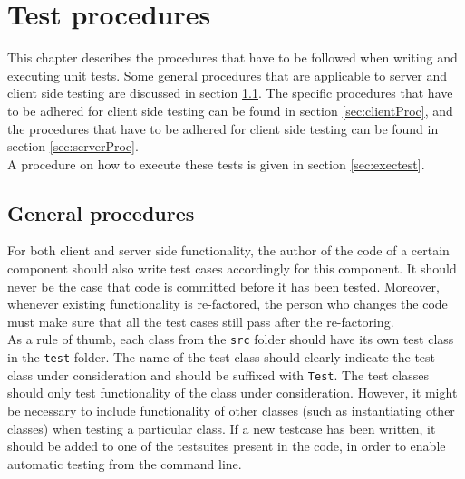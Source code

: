 \chapter{Test procedures}\label{chap:testProc}
This chapter describes the procedures that have to be followed when writing and executing unit tests. Some general procedures that are applicable to server and client side testing are discussed in section \ref{sec:genProc}. The specific procedures that have to be adhered for client side testing can be found in section \ref{sec:clientProc}, and the procedures that have to be adhered for client side testing can be found in section \ref{sec:serverProc}.\\
 A procedure on how to execute these tests is given in section \ref{sec:exectest}.

\section{General procedures}\label{sec:genProc}
For both client and server side functionality, the author of the code of a certain component should also write test cases accordingly for this component. It should never be the case that code is committed before it has been tested. Moreover, whenever existing functionality is re-factored, the person who changes the code must make sure that all the test cases still pass after the re-factoring. \\
As a rule of thumb, each class from the \texttt{src} folder should have its own test class in the \texttt{test} folder. The name of the test class should clearly indicate the test class under consideration and should be suffixed with \texttt{Test}. The test classes should only test functionality of the class under consideration. However, it might be necessary to include functionality of other classes (such as instantiating other classes) when testing a particular class.
If a new testcase has been written, it should be added to one of the testsuites present in the code, in order to enable automatic testing from the command line.

